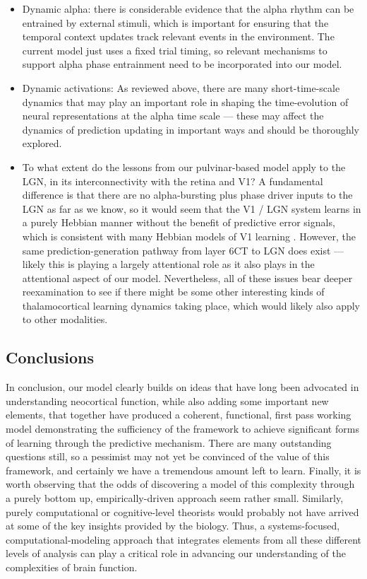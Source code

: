 \documentclass[11pt,twoside]{article}
\newif\myifpdf
\begin{document}
\begin{itemize}
\item Dynamic alpha: there is considerable evidence that the alpha rhythm can be entrained by external stimuli, which is important for ensuring that the temporal context updates track relevant events in the environment.  The current model just uses a fixed trial timing, so relevant mechanisms to support alpha phase entrainment need to be incorporated into our model.
\item Dynamic activations: As reviewed above, there are many short-time-scale dynamics that may play an important role in shaping the time-evolution of neural representations at the alpha time scale --- these may affect the dynamics of prediction updating in important ways and should be thoroughly explored.
\item To what extent do the lessons from our pulvinar-based model apply to the LGN, in its interconnectivity with the retina and V1?  A fundamental difference is that there are no alpha-bursting plus phase driver inputs to the LGN as far as we know, so it would seem that the V1 / LGN system learns in a purely Hebbian manner without the benefit of predictive error signals, which is consistent with many Hebbian models of V1 learning \cite[e.g.,]{MillerKellerStryker89,BednarMiikkulainen03}.  However, the same prediction-generation pathway from layer 6CT to LGN does exist --- likely this is playing a largely attentional role as it also plays in the attentional aspect of our model.  Nevertheless, all of these issues bear deeper reexamination to see if there might be some other interesting kinds of thalamocortical learning dynamics taking place, which would likely also apply to other modalities.
\end{itemize}

\subsection{Conclusions}

In conclusion, our model clearly builds on ideas that have long been advocated in understanding neocortical function, while also adding some important new elements, that together have produced a coherent, functional, first pass working model demonstrating the sufficiency of the framework to achieve significant forms of learning through the predictive mechanism.  There are many outstanding questions still, so a pessimist may not yet be convinced of the value of this framework, and certainly we have a tremendous amount left to learn.  Finally, it is worth observing that the odds of discovering a model of this complexity through a purely bottom up, empirically-driven approach seem rather small.  Similarly, purely computational or cognitive-level theorists would probably not have arrived at some of the key insights provided by the biology.  Thus, a systems-focused, computational-modeling approach that integrates elements from all these different levels of analysis can play a critical role in advancing our understanding of the complexities of brain function.
\end{document}
